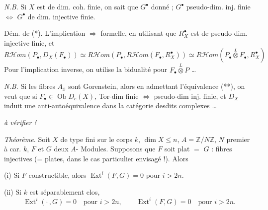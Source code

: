 \documentclass[11pt,a4paper]{article}
\begin{document}
\emph{N.B.} Si $X$ est de dim. coh. finie, on sait que $G^{\bullet}$ donné ;
$G^{\bullet}$ pseudo-dim. inj. finie $\Longleftrightarrow$ $G^{\bullet}$ de dim.
injective finie.

Dém. de (*). L'implication $\Rightarrow$ formelle, en utilisant que
$R^{\bullet}_{X}$ est de pseudo-dim. injective finie, et
\[
  R\mathcal{H}om(P_{\bullet}, D_{X}(F_{\bullet}))
  \simeq R\mathcal{H}om(P_{\bullet}, R\mathcal{H}om(F_{\bullet}, R^{\bullet}_{X}))
  \simeq R\mathcal{H}om(P_{\bullet} \overset{L}{\otimes} F_{\bullet}, R^{\bullet}_{X})
\]
Pour l'implication inverse, on utilise la bidualité pour
$F_{\bullet} \overset{L}{\otimes} P$ …

\emph{N.B.} Si les fibres \ill{} $A_{\bar{x}}$ sont Gorenstein, alors en
admettant l'équivalence (**), on veut que si
$F_{\bullet} \in \operatorname{Ob} D_{c}(X)$, Tor-dim finie $\Longleftrightarrow$
pseudo-dim inj. finie, et $D_{X}$ induit une anti-autoéquivalence dans la
catégorie desdits complexes …


\struck{\ill{}} \emph{à vérifier !}

\emph{Théorème.} Soit $X$  de type fini sur le corps $k$,
$\dim X \leq n$, $A = \mathbb{Z}/N\mathbb{Z}$, $N$ premier à car. $k$,
 $F$ et $G$ deux $A$-\struck{\ill{}} Modules. Supposons que $F$ soit
plat $=$ $G$ : fibres injectives (= plates, dans le cas particulier
envisagé !). Alors

(i) Si $F$ constructible, alors $\operatorname{Ext}^{i}(F, G) = 0$ pour $i > 2n$.

(ii) Si $k$ est séparablement clos,  
\[
  \operatorname{Ext}^{i}(\cdot\,, G) = 0 \quad \text{pour } i > 2n, \qquad
  \operatorname{Ext}^{i}(F, G) = 0 \quad \text{pour } i > 2n .
\]
\end{document}
